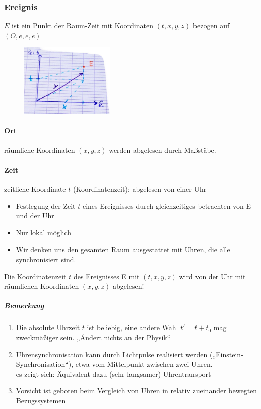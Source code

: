 \subsubsection{Ereignis}
$E$ ist ein Punkt der Raum-Zeit mit Koordinaten $(t,x,y,z)$ bezogen auf $(O,e,e,e)$
\begin{figure}[h]
\begin{center}
\includegraphics[width=0.4\textwidth]{Skizzen/Anhang10.jpg}
\end{center}
\caption{}
\end{figure}
\paragraph*{Ort}
räumliche Koordinaten $(x,y,z)$ werden abgelesen durch Maßstäbe.
\paragraph*{Zeit}
zeitliche Koordinate $t$ (Koordinatenzeit): abgelesen von einer Uhr\\
\begin{itemize}
\item Festlegung der Zeit $t$ eines Ereignisses durch gleichzeitiges betrachten von E und der Uhr
\item Nur lokal möglich
\item Wir denken uns den gesamten Raum ausgestattet mit Uhren, die alle synchronisiert sind.\\
\end{itemize}
Die Koordinatenzeit $t$ des Ereignisses E mit $(t,x,y,z)$ wird von der Uhr mit räumlichen Koordinaten $(x,y,z)$ abgelesen!

\subparagraph*{Bemerkung}
\begin{enumerate}
\item Die absolute Uhrzeit $t$ ist beliebig, eine andere Wahl $t'=t+t_0$ mag zweckmäßiger sein. „Ändert nichts an der Physik“
\item Uhrensynchronisation kann durch Lichtpulse realisiert werden („Einstein-Synchronisation“), etwa vom Mittelpunkt zwischen zwei Uhren.\\
es zeigt sich: Äquivalent dazu (sehr langsamer) Uhrentransport
\item Vorsicht ist geboten beim Vergleich von Uhren in relativ zueinander bewegten Bezugssystemen
\end{enumerate}

